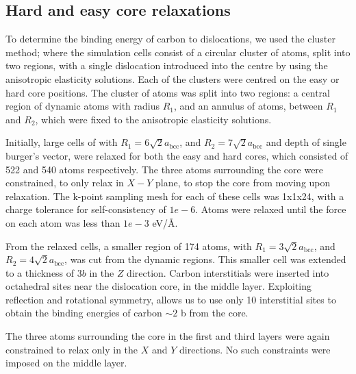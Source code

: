 \documentclass[a4paper]{article}
\begin{document}
\subsection{Hard and easy core relaxations}
\label{sec:org5130498}

To determine the binding energy of carbon to dislocations, we used the
cluster method; where the simulation cells consist of a circular cluster of
atoms, split into two regions, with a single dislocation introduced into the
centre by using the anisotropic elasticity solutions. Each of the clusters
were centred on the easy or hard core positions. The cluster of atoms was
split into two regions: a central region of dynamic atoms with radius \(R_1\),
and an annulus of atoms, between \(R_1\) and \(R_2\), which were fixed to the anisotropic
elasticity solutions. 

Initially, large cells of with \(R_1 = 6\sqrt{2}a_{\text{bcc}}\), and \(R_2 =
   7\sqrt{2}a_{\text{bcc}}\) and depth of single burger's vector, were relaxed
for both the easy and hard cores, which consisted of 522 and 540 atoms
respectively. The three atoms surrounding the core were constrained, to only
relax in \(X-Y\) plane, to stop the core from moving upon relaxation. The
k-point sampling mesh for each of these cells was 1x1x24, with a charge
tolerance for self-consistency of \(1e-6\). Atoms were relaxed until the force
on each atom was less than \(1e-3\) eV/\AA{}.  

From the relaxed cells, a smaller region of 174 atoms, with \(R_1 =
   3\sqrt{2}a_{\text{bcc}}\), and \(R_2 = 4\sqrt{2}a_{\text{bcc}}\), was cut from
the dynamic regions. This smaller cell was extended to a thickness of 3\(b\) in
the \(Z\) direction. Carbon interstitials were inserted into octahedral sites
near the dislocation core, in the middle layer. Exploiting reflection and
rotational symmetry, allows us to use only 10 interstitial
sites to obtain the binding energies of carbon \(\sim2\) b from the core. 

The three atoms surrounding the core in the first and third layers were again
constrained to relax only in the \(X\) and \(Y\) directions. No such constraints
were imposed on the middle layer. 
\end{document}
